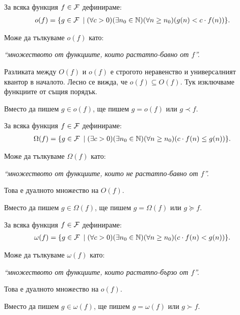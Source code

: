\begin{definition}
  За всяка функция $f \in \mathcal{F}$ дефинираме:
  \begin{align*}
    o(f) = \{ g \in \mathcal{F} \: \mid (\forall c > 0)(\exists n_0 \in \mathbb{N})(\forall n \geq n_0)(g(n) < c \cdot f(n))\}.
  \end{align*}
\end{definition}
Може да тълкуваме $o(f)$ като:
\begin{center}
  \textit{``множеството от функциите, които растат\footnotemark[1] по-бавно от $f$''.}
\end{center}
Разликата между $O(f)$ и $o(f)$ е строгото неравенство и универсалният квантор в началото.
Лесно се вижда, че $o(f) \subseteq O(f)$.
Тук изключваме функциите от същия порядък.
\begin{remark}
  Вместо да пишем $g \in o(f)$, ще пишем $g = o(f)$ или $g \prec f$.
\end{remark}

\begin{definition}
  За всяка функция $f \in \mathcal{F}$ дефинираме:
  \begin{align*}
    \Omega(f) = \{ g \in \mathcal{F} \: \mid (\exists c > 0)(\exists n_0 \in \mathbb{N})(\forall n \geq n_0)(c \cdot f(n) \leq g(n))\}.
  \end{align*}
\end{definition}
Може да тълкуваме $\Omega(f)$ като:
\begin{center}
  \textit{``множеството от функциите, които не растат\footnotemark[1] по-бавно от $f$''.}
\end{center}
Това е дуалното множество на $O(f)$.
\begin{remark}
  Вместо да пишем $g \in \Omega(f)$, ще пишем $g = \Omega(f)$ или $g \succeq f$.
\end{remark}

\begin{definition}
  За всяка функция $f \in \mathcal{F}$ дефинираме:
  \begin{align*}
    \omega(f) = \{ g \in \mathcal{F} \: \mid (\forall c > 0)(\exists n_0 \in \mathbb{N})(\forall n \geq n_0)(c \cdot f(n) < g(n))\}.
  \end{align*}
\end{definition}
Може да тълкуваме $\omega(f)$ като:
\begin{center}
  \textit{``множеството от функциите, които растат\footnotemark[1] по-бързо от $f$''.}
\end{center}
Това е дуалното множество на $o(f)$.
\begin{remark}
  Вместо да пишем $g \in \omega(f)$, ще пишем $g = \omega(f)$ или $g \succ f$.
\end{remark}

